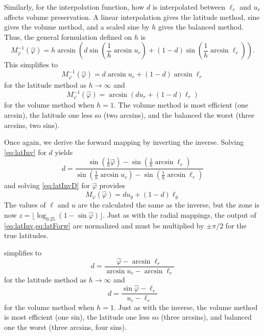 Similarly, for the interpolation function, how $d$ is interpolated between $\ell_r$ and $u_r$ affects volume preservation.
A linear interpolation gives the latitude method, sine gives the volume method, and a scaled sine by $h$ gives the balanced method.
Thus, the general formulation defined on $h$ is
%
\begin{equation} \label{eq:latInv}
M_\varphi^{-1}(\hat{\varphi}) = h \arcsin \left( d \sin \left( \frac{1}{h} \arcsin u_r \right) + \left( 1 - d \right) \sin \left( \frac{1}{h} \arcsin \ell_r \right) \right).
\end{equation}
%
This simplifies to
%
\begin{equation*}
M_\varphi^{-1}(\hat{\varphi}) = d \arcsin u_r  + \left( 1 - d \right) \arcsin \ell_r
\end{equation*}
%
for the latitude method as $h \rightarrow \infty$ and
%
\begin{equation*}
M_\varphi^{-1}(\hat{\varphi}) = \arcsin \left( d u_r + \left( 1 - d \right) \ell_r \right)
\end{equation*}
%
for the volume method when $h = 1$.
The volume method is most efficient (one arcsin), the latitude one less so (two arcsins), and the balanced the worst (three arcsins, two sins).


Once again, we derive the forward mapping by inverting the inverse.
Solving \cref{eq:latInv} for $d$ yields
%
\begin{equation} \label{latForwD}
d = \frac{ \sin \left( \frac{1}{h} \hat{\varphi} \right) - \sin \left( \frac{1}{h} \arcsin \ell_r \right) }{ \sin \left( \frac{1}{h} \arcsin u_r \right) - \sin \left( \frac{1}{h} \arcsin \ell_r \right) }
\end{equation}
%
and solving \cref{eq:latInvD} for $\hat{\varphi}$ provides
%
\begin{equation} \label{eq:latForw}
M_\varphi (\hat{\varphi}) = d u_g + \left( 1 - d \right) \ell_g
\end{equation}
%
The values of $\ell$ and $u$ are the calculated the same as the inverse, but the zone is now $z = \lfloor \log_{0.25} ( 1 - \sin \hat{\varphi} ) \rfloor$.
Just as with the radial mappings, the output of \cref{eq:latInv,eq:latForw} are normalized and must be multiplied by $\pm \pi / 2$ for the true latitudes.


 simplifies to
%
\begin{equation*}
d = \frac{ \hat{\varphi} - \arcsin \ell_r }{ \arcsin u_r - \arcsin \ell_r}
\end{equation*}
%
for the latitude method as $h \rightarrow \infty$ and
%
\begin{equation*}
d = \frac{ \sin \hat{\varphi} - \ell_r }{ u_r - \ell_r }
\end{equation*}
%
for the volume method when $h = 1$.
Just as with the inverse, the volume method is most efficient (one sin), the latitude one less so (three arcsins), and balanced one the worst (three arcsins, four sins).


